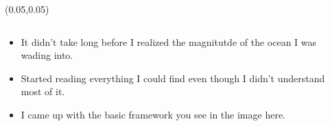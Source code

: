 \documentclass[aspectratio=169]{beamer} %
\begin{document}
\begin{frame}{}
    \setlength{\TPHorizModule}{\textwidth}
    \setlength{\TPVertModule}{\textwidth}
    \begin{textblock}{0.74} (0.05,0.05)
        \bfseries\large\textcolor{white}{What Have I Gotten Myself Into?}
    \end{textblock}
    \begin{columns}
    \begin{column}{0.5\textwidth}
        \begin{itemize}
            \item It didn't take long before I realized the magnitutde of the ocean I was wading into.
            \item Started reading everything I could find even though I didn't understand most of it.
            \item I came up with the basic framework you see in the image here.
        \end{itemize}
    \end{column}
    \begin{column}{0.45\textwidth}
        \begin{center}

\end{center}
\end{column}
\end{columns}
\end{frame}
\end{document}
